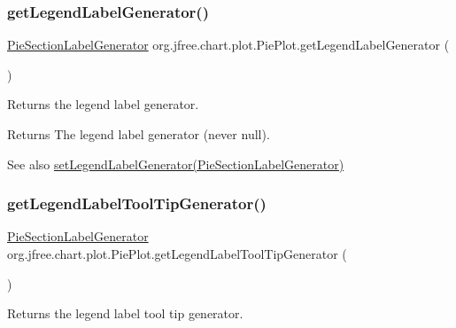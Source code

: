 \subsubsection{\texorpdfstring{get\+Legend\+Label\+Generator()}{getLegendLabelGenerator()}}
{\footnotesize\ttfamily \mbox{\hyperlink{interfaceorg_1_1jfree_1_1chart_1_1labels_1_1_pie_section_label_generator}{Pie\+Section\+Label\+Generator}} org.\+jfree.\+chart.\+plot.\+Pie\+Plot.\+get\+Legend\+Label\+Generator (\begin{DoxyParamCaption}{ }\end{DoxyParamCaption})}

Returns the legend label generator.

\begin{DoxyReturn}{Returns}
The legend label generator (never {\ttfamily null}).
\end{DoxyReturn}
\begin{DoxySeeAlso}{See also}
\mbox{\hyperlink{classorg_1_1jfree_1_1chart_1_1plot_1_1_pie_plot_a254e74c5936f13ce22a9b0b1392deb7e}{set\+Legend\+Label\+Generator(\+Pie\+Section\+Label\+Generator)}} 
\end{DoxySeeAlso}
\mbox{\label{classorg_1_1jfree_1_1chart_1_1plot_1_1_pie_plot_a21f044ff1f4be266a6a9cd4d34a549d6}} 
\subsubsection{\texorpdfstring{get\+Legend\+Label\+Tool\+Tip\+Generator()}{getLegendLabelToolTipGenerator()}}
{\footnotesize\ttfamily \mbox{\hyperlink{interfaceorg_1_1jfree_1_1chart_1_1labels_1_1_pie_section_label_generator}{Pie\+Section\+Label\+Generator}} org.\+jfree.\+chart.\+plot.\+Pie\+Plot.\+get\+Legend\+Label\+Tool\+Tip\+Generator (\begin{DoxyParamCaption}{ }\end{DoxyParamCaption})}

Returns the legend label tool tip generator.

